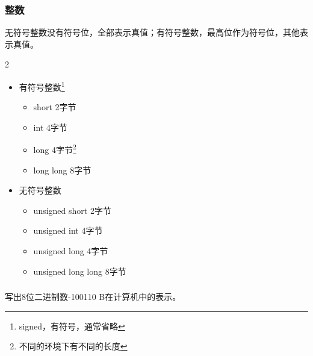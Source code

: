\begin{frame}
    \frametitle{整数}
    无符号整数没有符号位，全部表示真值；有符号整数，最高位作为符号位，其他表示真值。
    \begin{multicols}{2}
        \begin{itemize}
          \item 有符号整数\footnote{signed，有符号，通常省略}
            \begin{itemize}
              \item short \hspace{2.5em} 2字节
              \item int \hspace{3.4em} 4字节
              \item long \hspace{2.75em} 4字节\footnote{不同的环境下有不同的长度}
              \item long long \quad 8字节
            \end{itemize}
          \item 无符号整数
          \begin{itemize}
            \item unsigned short \hspace{2.5em} 2字节
            \item unsigned int \hspace{3.4em} 4字节
            \item unsigned long \hspace{2.75em} 4字节
            \item unsigned long long \quad 8字节
          \end{itemize}
        \end{itemize}
    \end{multicols}
\end{frame}


\begin{frame}[t]
    \frametitle{}
    \begin{example}
        写出8位二进制数-100110 B在计算机中的表示。
    \end{example}
    \pause
    \begin{center}
    \end{center}
\end{frame}

